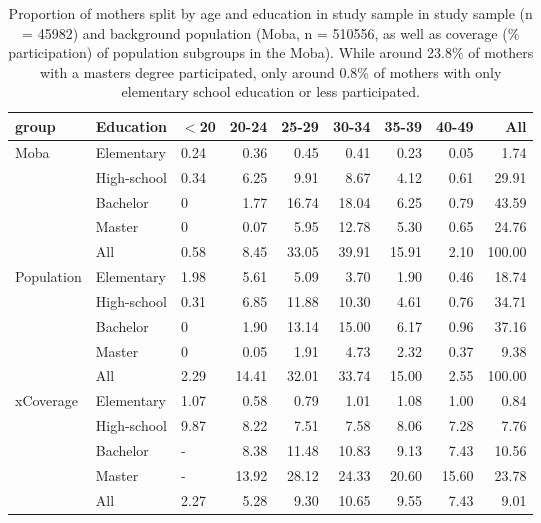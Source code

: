 \begin{table}[ht]
\centering
\begin{tabular}{lllrrrrrr}
  \hline
group & Education & $<$20 & 20-24 & 25-29 & 30-34 & 35-39 & 40-49 & All \\ 
  \hline
Moba & Elementary & 0.24 & 0.36 & 0.45 & 0.41 & 0.23 & 0.05 & 1.74 \\ 
   & High-school & 0.34 & 6.25 & 9.91 & 8.67 & 4.12 & 0.61 & 29.91 \\ 
   & Bachelor & 0 & 1.77 & 16.74 & 18.04 & 6.25 & 0.79 & 43.59 \\ 
   & Master & 0 & 0.07 & 5.95 & 12.78 & 5.30 & 0.65 & 24.76 \\ 
   & All & 0.58 & 8.45 & 33.05 & 39.91 & 15.91 & 2.10 & 100.00 \\ 
  Population & Elementary & 1.98 & 5.61 & 5.09 & 3.70 & 1.90 & 0.46 & 18.74 \\ 
   & High-school & 0.31 & 6.85 & 11.88 & 10.30 & 4.61 & 0.76 & 34.71 \\ 
   & Bachelor & 0 & 1.90 & 13.14 & 15.00 & 6.17 & 0.96 & 37.16 \\ 
   & Master & 0 & 0.05 & 1.91 & 4.73 & 2.32 & 0.37 & 9.38 \\ 
   & All & 2.29 & 14.41 & 32.01 & 33.74 & 15.00 & 2.55 & 100.00 \\ 
  xCoverage & Elementary & 1.07 & 0.58 & 0.79 & 1.01 & 1.08 & 1.00 & 0.84 \\ 
   & High-school & 9.87 & 8.22 & 7.51 & 7.58 & 8.06 & 7.28 & 7.76 \\ 
   & Bachelor & - & 8.38 & 11.48 & 10.83 & 9.13 & 7.43 & 10.56 \\ 
   & Master & - & 13.92 & 28.12 & 24.33 & 20.60 & 15.60 & 23.78 \\ 
   & All & 2.27 & 5.28 & 9.30 & 10.65 & 9.55 & 7.43 & 9.01 \\ 
   \hline
\end{tabular}
\caption{Proportion of mothers split by age and education in study sample
                                     in study sample  (n = 45982) and background population (Moba, n = 510556, as well as coverage (\% participation) of population subgroups in the Moba). 
                                     While around 23.8\% of mothers with a masters degree participated, only around 
                                     0.8\% of mothers with only elementary school education or less participated.} 
\label{table:age_edu}
\end{table}
